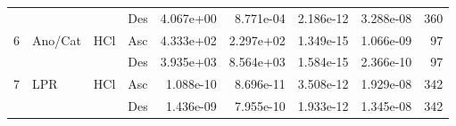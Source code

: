 \begin{tabular}{llllrrrrr}
  &     &     & Des &                 4.067e+00 &                  8.771e-04 &                    2.186e-12 &                              3.288e-08 &  360 \\
6 & Ano/Cat & HCl & Asc &                 4.333e+02 &                  2.297e+02 &                    1.349e-15 &                              1.066e-09 &   97 \\
  &     &     & Des &                 3.935e+03 &                  8.564e+03 &                    1.584e-15 &                              2.366e-10 &   97 \\
7 & LPR & HCl & Asc &                 1.088e-10 &                  8.696e-11 &                    3.508e-12 &                              1.929e-08 &  342 \\
  &     &     & Des &                 1.436e-09 &                  7.955e-10 &                    1.933e-12 &                              1.345e-08 &  342 \\
\bottomrule
\end{tabular}
